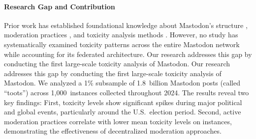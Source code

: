 \paragraph{Research Gap and Contribution}
Prior work has established foundational knowledge about Mastodon's structure \cite{zulli:2020,la_cava:2021}, moderation practices \cite{bono:2024,nicholson:2023}, and toxicity analysis methods \cite{fan:2022}. However, no study has systematically examined toxicity patterns across the entire Mastodon network while accounting for its federated architecture. Our research addresses this gap by conducting the first large-scale toxicity analysis of Mastodon. Our research addresses this gap by conducting the first large-scale toxicity analysis of Mastodon. We analyzed a 1\% subsample of 1.8~billion Mastodon posts (called ``toots'') across 1,000~instances collected throughout 2024. The results reveal two key findings: First, toxicity levels show significant spikes during major political and global events, particularly around the U.S.~election period. Second, active moderation practices correlate with lower mean toxicity levels on instances, demonstrating the effectiveness of decentralized moderation approaches.

\enlargethispage{\baselineskip}
